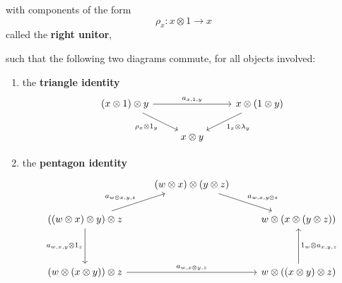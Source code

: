 \begin{definition}
\begin{enumerate}[label=(\roman*)]
\begin{equation}
      \end{equation}
      with components of the form
      \begin{equation}
      \rho_x: x \otimes 1 \to x
      \end{equation}
      called the \textbf{right unitor},
  \end{enumerate}
  such that the following two diagrams commute, for all objects involved:
  \begin{enumerate}[label=(\roman*)]
    \item the \textbf{triangle identity}
      \[\begin{tikzcd}
	      {(x\otimes 1)\otimes y} && {x \otimes(1\otimes y)} \\
	                              & {x \otimes y}
	                              \arrow["{a_{x,1,y}}", from=1-1, to=1-3]
	                              \arrow["{\rho_x \otimes 1_y}"', from=1-1, to=2-2]
	                              \arrow["{1_x \otimes \lambda_y}", from=1-3, to=2-2]
      \end{tikzcd}\]
    \item the \textbf{pentagon identity}
      \[\begin{tikzcd}
	& {(w \otimes x) \otimes (y \otimes z)} \\
	      {((w \otimes x)\otimes y)\otimes z} && {w \otimes( x \otimes (y \otimes z))} \\
	      \\
	      {(w\otimes(x\otimes y))\otimes z} && {w\otimes((x\otimes y)\otimes z)}
	      \arrow["{a_{w, x\otimes y,z}}", from=4-1, to=4-3]
	      \arrow["{a_{w,x,y}\otimes 1_z}"', from=2-1, to=4-1]
	      \arrow["{1_w\otimes a_{x,y,z}}"', from=4-3, to=2-3]
	      \arrow["{a_{w\otimes x,y,z}}", from=2-1, to=1-2]
	      \arrow["{a_{w, x,y\otimes z}}", from=1-2, to=2-3]
      \end{tikzcd}\]
  \end{enumerate}
\end{definition}

